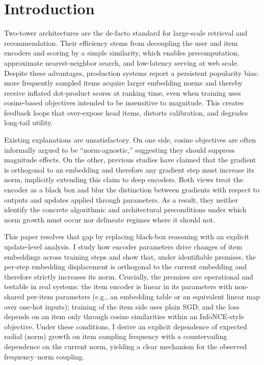 \section{Introduction}
Two-tower architectures are the de-facto standard for large-scale retrieval and recommendation. Their efficiency stems from decoupling the user and item encoders and scoring by a simple similarity, which enables precomputation, approximate nearest-neighbor search, and low-latency serving at web scale. Despite these advantages, production systems report a persistent popularity bias: more frequently sampled items acquire larger embedding norms and thereby receive inflated dot-product scores at ranking time, even when training uses cosine-based objectives intended to be insensitive to magnitude. This creates feedback loops that over-expose head items, distorts calibration, and degrades long-tail utility.

Existing explanations are unsatisfactory. On one side, cosine objectives are often informally argued to be “norm-agnostic,” suggesting they should suppress magnitude effects. On the other, previous studies have claimed that the gradient is orthogonal to an embedding and therefore any gradient step must increase its norm, implicitly extending this claim to deep encoders. Both views treat the encoder as a black box and blur the distinction between gradients with respect to outputs and updates applied through parameters. As a result, they neither identify the concrete algorithmic and architectural preconditions under which norm growth must occur nor delineate regimes where it should not.

This paper resolves that gap by replacing black-box reasoning with an explicit update-level analysis. I study how encoder parameters drive changes of item embeddings across training steps and show that, under identifiable premises, the per-step embedding displacement is orthogonal to the current embedding and therefore strictly increases its norm. Crucially, the premises are operational and testable in real systems: the item encoder is linear in its parameters with non-shared per-item parameters (e.g., an embedding table or an equivalent linear map over one-hot inputs); training of the item side uses plain SGD; and the loss depends on an item only through cosine similarities within an InfoNCE-style objective. Under these conditions, I derive an explicit dependence of expected radial (norm) growth on item sampling frequency with a countervailing dependence on the current norm, yielding a clear mechanism for the observed frequency–norm coupling.

